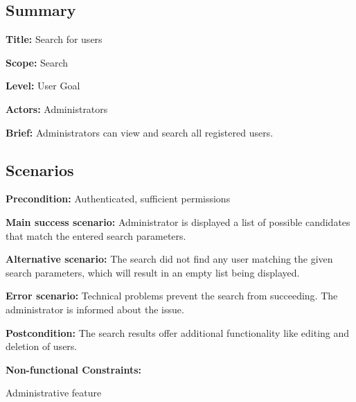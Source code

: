 \subsection*{Summary}


\begin{DoxyItemize}
\item {\bfseries Title\+:} Search for users
\item {\bfseries Scope\+:} Search
\item {\bfseries Level\+:} User Goal
\item {\bfseries Actors\+:} Administrators
\item {\bfseries Brief\+:} Administrators can view and search all registered users.
\end{DoxyItemize}

\subsection*{Scenarios}


\begin{DoxyItemize}
\item {\bfseries Precondition\+:} Authenticated, sufficient permissions
\item {\bfseries Main success scenario\+:} Administrator is displayed a list of possible candidates that match the entered search parameters.
\item {\bfseries Alternative scenario\+:} The search did not find any user matching the given search parameters, which will result in an empty list being displayed.
\item {\bfseries Error scenario\+:} Technical problems prevent the search from succeeding. The administrator is informed about the issue.
\item {\bfseries Postcondition\+:} The search results offer additional functionality like editing and deletion of users.
\item {\bfseries Non-\/functional Constraints\+:}
\begin{DoxyItemize}
\item Administrative feature 
\end{DoxyItemize}
\end{DoxyItemize}